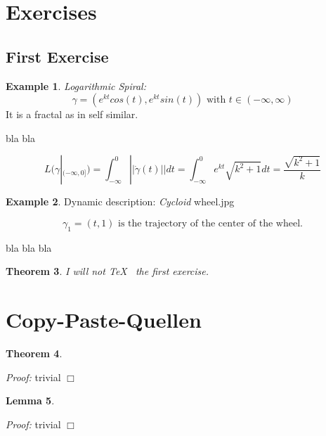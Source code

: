 \documentclass[a4paper,11pt,notitlepage,fullpage]{paper}
\theoremstyle{plain}
\newtheorem{thm}{Theorem}[section] %
\newtheorem{lem}[thm]{Lemma}
\theoremstyle{definition}
\newtheorem{exmp}[thm]{Example} %
\begin{document}
\section{Exercises}

\subsection{First Exercise}

\begin{exmp}
\emph{Logarithmic Spiral:}
\begin{equation*}
\gamma = (e^{kt} cos(t), e^{kt} sin(t)) \text{ with } t \in (-\infty, \infty)
\end{equation*}
It is a fractal as in self similar.

bla bla

\begin{equation*}
L(\gamma|_{(-\infty, 0]}) = \int_{-\infty}^0 ||\dot\gamma(t)|| dt = \int_{-\infty}^0 e^{kt} \sqrt{k^2+1} dt = \frac{\sqrt{k^2+1}}{k}
\end{equation*}

\end{exmp}

\begin{exmp}
Dynamic description: \emph{Cycloid}
wheel.jpg

\begin{equation*}
\gamma_1 = (t, 1) \text{ is the trajectory of the center of the wheel.}
\end{equation*}

bla bla bla
\end{exmp}

\begin{thm}
I will not \TeX~ the first exercise.
\end{thm}


\section{Copy-Paste-Quellen}



\begin{thm}

\end{thm}
\emph{Proof:} trivial \hfill $\Box$

\begin{lem}

\end{lem}
\emph{Proof:} trivial \hfill $\Box$
\end{document}
